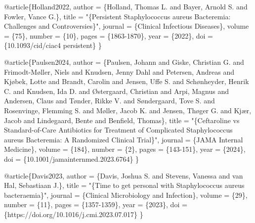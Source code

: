 \documentclass[
  letterpaper,
  DIV=11,
  numbers=noendperiod]{scrartcl}
\newenvironment{Shaded}{\begin{snugshade}}{\end{snugshade}}
\newcommand{\DataTypeTok}[1]{\textcolor[rgb]{0.68,0.00,0.00}{#1}}
\newcommand{\NormalTok}[1]{\textcolor[rgb]{0.00,0.23,0.31}{#1}}
\newcommand{\OtherTok}[1]{\textcolor[rgb]{0.00,0.23,0.31}{#1}}
\newcommand{\StringTok}[1]{\textcolor[rgb]{0.13,0.47,0.30}{#1}}
\newcommand{\VariableTok}[1]{\textcolor[rgb]{0.07,0.07,0.07}{#1}}
\begin{document}
\begin{Shaded}
\begin{Highlighting}[]
\VariableTok{@article}\NormalTok{\{}\OtherTok{Holland2022}\NormalTok{,}
    \DataTypeTok{author}\NormalTok{ = \{Holland, Thomas L. and Bayer, Arnold S. and Fowler, Vance G.\},}
    \DataTypeTok{title}\NormalTok{ = "}\StringTok{\{Persistent Staphylococcus aureus Bacteremia: Challenges and Controversies\}}\NormalTok{",}
    \DataTypeTok{journal}\NormalTok{ = \{Clinical Infectious Diseases\},}
    \DataTypeTok{volume}\NormalTok{ = \{75\},}
    \DataTypeTok{number}\NormalTok{ = \{10\},}
    \DataTypeTok{pages}\NormalTok{ = \{1863{-}1870\},}
    \DataTypeTok{year}\NormalTok{ = \{2022\},}
    \DataTypeTok{doi}\NormalTok{ = \{10.1093/cid/ciac4 persistent\}}
\NormalTok{\}}

\VariableTok{@article}\NormalTok{\{}\OtherTok{Paulsen2024}\NormalTok{,}
    \DataTypeTok{author}\NormalTok{ = \{Paulsen, Johann and Giske, Christian G. and Frimodt{-}Møller, Niels and Knudsen, Jenny Dahl and Petersen, Andreas and Kjøbek, Lotte and Brandt, Carolin and Jensen, Uffe S. and Schønheyder, Henrik C. and Knudsen, Ida D. and Østergaard, Christian and Arpi, Magnus and Andersen, Claus and Tønder, Rikke V. and Søndergaard, Tove S. and Rosenvinge, Flemming S. and Møller, Jacob K. and Jensen, Thøger G. and Kjær, Jacob and Lindegaard, Bente and Benfield, Thomas\},}
    \DataTypeTok{title}\NormalTok{ = "}\StringTok{\{Ceftaroline vs Standard{-}of{-}Care Antibiotics for Treatment of Complicated Staphylococcus aureus Bacteremia: A Randomized Clinical Trial\}}\NormalTok{",}
    \DataTypeTok{journal}\NormalTok{ = \{JAMA Internal Medicine\},}
    \DataTypeTok{volume}\NormalTok{ = \{184\},}
    \DataTypeTok{number}\NormalTok{ = \{2\},}
    \DataTypeTok{pages}\NormalTok{ = \{143{-}151\},}
    \DataTypeTok{year}\NormalTok{ = \{2024\},}
    \DataTypeTok{doi}\NormalTok{ = \{10.1001/jamainternmed.2023.6764\}}
\NormalTok{\}}

\VariableTok{@article}\NormalTok{\{}\OtherTok{Davis2023}\NormalTok{,}
    \DataTypeTok{author}\NormalTok{ = \{Davis, Joshua S. and Stevens, Vanessa and van Hal, Sebastiaan J.\},}
    \DataTypeTok{title}\NormalTok{ = "}\StringTok{\{Time to get personal with Staphylococcus aureus bacteraemia\}}\NormalTok{",}
    \DataTypeTok{journal}\NormalTok{ = \{Clinical Microbiology and Infection\},}
    \DataTypeTok{volume}\NormalTok{ = \{29\},}
    \DataTypeTok{number}\NormalTok{ = \{11\},}
    \DataTypeTok{pages}\NormalTok{ = \{1357{-}1359\},}
    \DataTypeTok{year}\NormalTok{ = \{2023\},}
    \DataTypeTok{doi}\NormalTok{ = \{https://doi.org/10.1016/j.cmi.2023.07.017\}}
\NormalTok{\}}


\end{Highlighting}
\end{Shaded}
\end{document}
